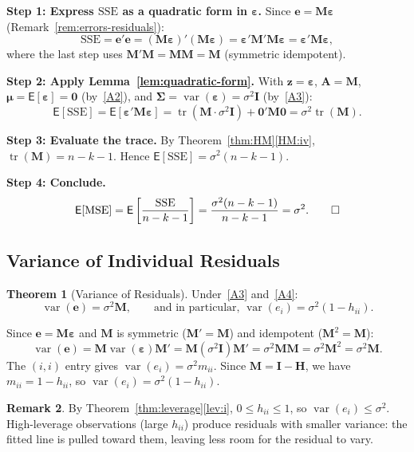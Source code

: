\documentclass[12pt,a4paper]{article}
\makeatletter
\theoremstyle{definition}
\newtheorem{theorem}{Theorem}[section]
\newtheorem{remark}[theorem]{Remark}
\renewenvironment{proof}[1][\proofname]{\par
  \pushQED{\qed}%
  \normalfont \topsep6\p@\@plus6\p@\relax
  \trivlist
  \item[\hskip\labelsep\bfseries #1\@addpunct{.}]\ignorespaces
}{%
  \popQED\endtrivlist\@endpefalse
}
\newcommand\expc{\mathsf{E}}
\DeclareMathOperator\var{var}
\DeclareMathOperator\tr{tr}
\newcommand{\SSE}{\mathrm{SSE}}
\newcommand{\MSE}{\mathrm{MSE}}
\newcommand{\be}{\boldsymbol{\varepsilon}}
\newcommand{\bI}{\mathbf{I}}
\newcommand{\bH}{\mathbf{H}}
\newcommand{\bM}{\mathbf{M}}
\newcommand{\bzero}{\mathbf{0}}
\newcommand{\bz}{\mathbf{z}}
\newcommand{\bA}{\mathbf{A}}
\makeatother
\begin{document}
\begin{proof}
\textbf{Step 1: Express $\SSE$ as a quadratic form in $\be$.} Since $\mathbf{e} = \bM\be$ (Remark~\ref{rem:errors-residuals}):
\[
\SSE = \mathbf{e}'\mathbf{e} = (\bM\be)'(\bM\be) = \be'\bM'\bM\be = \be'\bM\be,
\]
where the last step uses $\bM'\bM = \bM\bM = \bM$ (symmetric idempotent).

\textbf{Step 2: Apply Lemma~\ref{lem:quadratic-form}.} With $\bz = \be$, $\bA = \bM$, $\boldsymbol\mu = \expc[\be] = \bzero$ (by~\ref{A2}), and $\boldsymbol\Sigma = \var(\be) = \sigma^2\bI$ (by~\ref{A3}):
\[
\expc[\SSE] = \expc[\be'\bM\be] = \tr(\bM \cdot \sigma^2\bI) + \bzero'\bM\bzero = \sigma^2\tr(\bM).
\]

\textbf{Step 3: Evaluate the trace.} By Theorem~\ref{thm:HM}\ref{HM:iv}, $\tr(\bM) = n - k - 1$. Hence $\expc[\SSE] = \sigma^2(n - k - 1)$.

\textbf{Step 4: Conclude.}
\[
\expc[\MSE] = \expc\left[\frac{\SSE}{n-k-1}\right] = \frac{\sigma^2(n-k-1)}{n-k-1} = \sigma^2. \qedhere
\]
\end{proof}

\subsection{Variance of Individual Residuals}

\begin{theorem}[Variance of Residuals]\label{thm:var-resid}
Under~\ref{A3} and~\ref{A4}:
\begin{equation}
\var(\mathbf{e}) = \sigma^2\bM, \qquad \text{and in particular, } \var(e_i) = \sigma^2(1 - h_{ii}).
\end{equation}
\end{theorem}

\begin{proof}
Since $\mathbf{e} = \bM\be$ and $\bM$ is symmetric ($\bM' = \bM$) and idempotent ($\bM^2 = \bM$):
\[
\var(\mathbf{e}) = \bM\var(\be)\bM' = \bM(\sigma^2\bI)\bM' = \sigma^2\bM\bM = \sigma^2\bM^2 = \sigma^2\bM.
\]
The $(i, i)$ entry gives $\var(e_i) = \sigma^2 m_{ii}$. Since $\bM = \bI - \bH$, we have $m_{ii} = 1 - h_{ii}$, so $\var(e_i) = \sigma^2(1 - h_{ii})$.
\end{proof}

\begin{remark}\label{rem:var-resid-bound}
By Theorem~\ref{thm:leverage}\ref{lev:i}, $0 \leqslant h_{ii} \leqslant 1$, so $\var(e_i) \leqslant \sigma^2$. High-leverage observations (large $h_{ii}$) produce residuals with smaller variance: the fitted line is pulled toward them, leaving less room for the residual to vary.
\end{remark}
\end{document}
